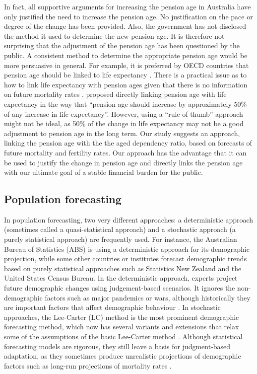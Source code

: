 \documentclass[11pt,a4paper,]{article}
\begin{document}
In fact, all supportive arguments for increasing the pension age in Australia have only justified the need to increase the pension age. No justification on the pace or degree of the change has been provided. Also, the government has not disclosed the method it used to determine the new pension age. It is therefore not surprising that the adjustment of the pension age has been questioned by the public. A consistent method to determine the appropriate pension age would be more persuasive in general. For example, it is preferred by OECD countries that pension age should be linked to life expectancy \autocite{OECD12}. There is a practical issue as to how to link life expectancy with pension ages given that there is no information on future mortality rates \autocite{PC13}. \textcite[p7]{CEDA07} proposed directly linking pension age with life expectancy in the way that ``pension age should increase by approximately 50\% of any increase in life expectancy''. However, using a ``rule of thumb'' approach might not be ideal, as 50\% of the change in life expectancy may not be a good adjustment to pension age in the long term. Our study suggests an approach, linking the pension age with the the aged dependency ratio, based on forecasts of future mortality and fertility rates. Our approach has the advantage that it can be used to justify the change in pension age and directly links the pension age with our ultimate goal of a stable financial burden for the public.

\hypertarget{population-forecasting}{%
\subsection{Population forecasting}\label{population-forecasting}}

In population forecasting, two very different approaches: a deterministic approach (sometimes called a quasi-statistical approach) and a stochastic approach (a purely statistical approach) are frequently used. For instance, the Australian Bureau of Statistics (ABS) is using a deterministic approach for its demographic projection, while some other countries or institutes forecast demographic trends based on purely statistical approaches such as Statistics New Zealand and the United States Census Bureau. In the deterministic approach, experts project future demographic changes using judgement-based scenarios. It ignores the non-demographic factors such as major pandemics or wars, although historically they are important factors that affect demographic behaviour \autocite{PC13}. In stochastic approaches, the Lee-Carter (LC) method \autocite{LC92} is the most prominent demographic forecasting method, which now has several variants and extensions that relax some of the assumptions of the basic Lee-Carter method \autocite[see, e.g.,][]{SBH11}. Although statistical forecasting models are rigorous, they still leave a basis for judgment-based adaptation, as they sometimes produce unrealistic projections of demographic factors such as long-run projections of mortality rates \autocite{PC13}.
\end{document}
